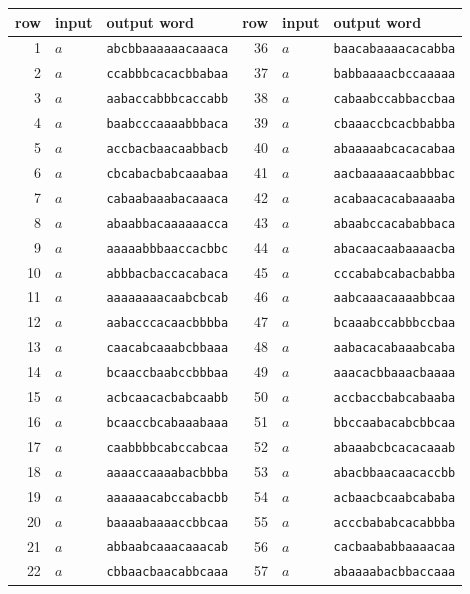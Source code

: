 \begin{table}[p]
\centering\small
\begin{tabular}{rllrll}\toprule
row&input&output word&row&input&output word\\\midrule
1&$a$&\texttt{abcbbaaaaaacaaaca}&36&$a$&\texttt{baacabaaaacacabba}\\
2&$a$&\texttt{ccabbbcacacbbabaa}&37&$a$&\texttt{babbaaaacbccaaaaa}\\
3&$a$&\texttt{aabaccabbbcaccabb}&38&$a$&\texttt{cabaabccabbaccbaa}\\
4&$a$&\texttt{baabcccaaaabbbaca}&39&$a$&\texttt{cbaaaccbcacbbabba}\\
5&$a$&\texttt{accbacbaacaabbacb}&40&$a$&\texttt{abaaaaabcacacabaa}\\
6&$a$&\texttt{cbcabacbabcaaabaa}&41&$a$&\texttt{aacbaaaaacaabbbac}\\
7&$a$&\texttt{cabaabaaabacaaaca}&42&$a$&\texttt{acabaacacabaaaaba}\\
8&$a$&\texttt{abaabbacaaaaaacca}&43&$a$&\texttt{abaabccacababbaca}\\
9&$a$&\texttt{aaaaabbbaaccacbbc}&44&$a$&\texttt{abacaacaabaaaacba}\\
10&$a$&\texttt{abbbacbaccacabaca}&45&$a$&\texttt{cccababcabacbabba}\\
11&$a$&\texttt{aaaaaaaacaabcbcab}&46&$a$&\texttt{aabcaaacaaaabbcaa}\\
12&$a$&\texttt{aabacccacaacbbbba}&47&$a$&\texttt{bcaaabccabbbccbaa}\\
13&$a$&\texttt{caacabcaaabcbbaaa}&48&$a$&\texttt{aabacacabaaabcaba}\\
14&$a$&\texttt{bcaaccbaabccbbbaa}&49&$a$&\texttt{aaacacbbaaacbaaaa}\\
15&$a$&\texttt{acbcaacacbabcaabb}&50&$a$&\texttt{accbaccbabcabaaba}\\
16&$a$&\texttt{bcaaccbcabaaabaaa}&51&$a$&\texttt{bbccaabacabcbbcaa}\\
17&$a$&\texttt{caabbbbcabccabcaa}&52&$a$&\texttt{abaaabcbcacacaaab}\\
18&$a$&\texttt{aaaaccaaaabacbbba}&53&$a$&\texttt{abacbbaacaacaccbb}\\
19&$a$&\texttt{aaaaaacabccabacbb}&54&$a$&\texttt{acbaacbcaabcababa}\\
20&$a$&\texttt{baaaabaaaaccbbcaa}&55&$a$&\texttt{acccbababcacabbba}\\
21&$a$&\texttt{abbaabcaaacaaacab}&56&$a$&\texttt{cacbaababbaaaacaa}\\
22&$a$&\texttt{cbbaacbaacabbcaaa}&57&$a$&\texttt{abaaaabacbbaccaaa}\\

\end{tabular}
\end{table}

